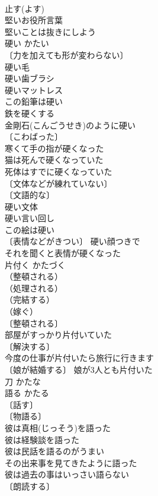 \documentclass[8pt]{extreport}
\begin{document}
\begin{CJK}{UTF8}{min}
\\	止す(よす)　
\\	堅いお役所言葉 
\\	堅いことは抜きにしよう 
\\	硬い	かたい	
\\	〔力を加えても形が変わらない〕
\\	硬い毛 
\\	硬い歯ブラシ 
\\	硬いマットレス 
\\	この鉛筆は硬い 
\\	鉄を硬くする 
\\	金剛石(こんごうせき)のように硬い 
\\	〔こわばった〕
\\	寒くて手の指が硬くなった 
\\	猫は死んで硬くなっていた 
\\	死体はすでに硬くなっていた 
\\	〔文体などが練れていない〕
\\	〔文語的な〕
\\	硬い文体 
\\	硬い言い回し 
\\	この絵は硬い 
\\	〔表情などがきつい〕 硬い顔つきで 
\\	それを聞くと表情が硬くなった 
\\	片付く	かたづく	
\\	（整頓される）
\\	（処理される）
\\	（完結する）
\\	（嫁ぐ）
\\	〔整頓される〕
\\	部屋がすっかり片付いていた 
\\	〔解決する〕
\\	今度の仕事が片付いたら旅行に行きます 
\\	〔娘が結婚する〕 娘が3人とも片付いた 
\\	刀	かたな	
\\	語る	かたる	
\\	〔話す〕
\\	〔物語る〕
\\	彼は真相(じっそう)を語った 
\\	彼は経験談を語った 
\\	彼は民話を語るのがうまい 
\\	その出来事を見てきたように語った 
\\	彼は過去の事はいっさい語らない 
\\	〔朗読する〕

\end{CJK}
\end{document}
